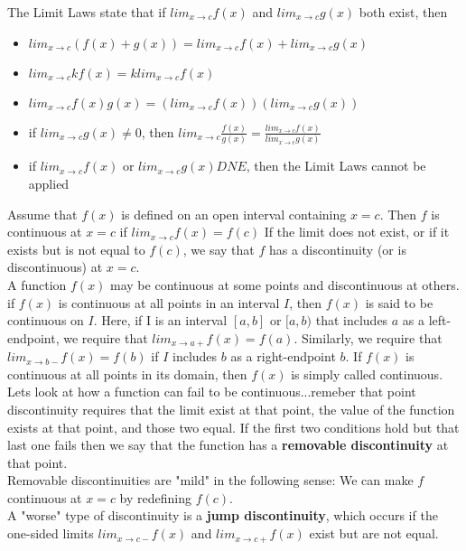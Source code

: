 \documentclass{article}
\begin{document}
	The Limit Laws state that if $lim_{x \to c}f(x)$ and $lim_{x \to c}g(x)$ both exist, then
		\begin{itemize}
			\item $lim_{x \to c}(f(x) + g(x)) = lim_{x \to c}f(x) + lim_{x \to c}g(x)$
			\item $lim_{x \to c}kf(x) = klim_{x \to c}f(x)$
			\item $lim_{x \to c}f(x)g(x) = (lim_{x \to c}f(x))(lim_{x \to c}g(x))$
			\item if $lim_{x \to c}g(x) \neq 0$, then $lim_{x \to c}\frac{f(x)}{g(x)} = \frac{lim_{x \to c}f(x)}{lim_{x \to c}g(x)}$
			\item if $lim_{x \to c}f(x)$ or $lim_{x \to c}g(x) DNE$, then the Limit Laws cannot be applied
		\end{itemize}

	Assume that $f(x)$ is defined on an open interval containing $x = c$. Then $f$ is continuous at $x = c$ if $lim_{x \to c}f(x) = f(c)$ If the limit does not exist, or if it exists but is not equal to $f(c)$, we say that $f$ has a discontinuity (or is discontinuous) at $x = c$.\\

	A function $f(x)$ may be continuous at some points and discontinuous at others. if $f(x)$ is continuous at all points in an interval $I$, then $f(x)$ is said to be continuous on $I$. Here, if I is an interval $[a, b]$ or $[a, b)$ that includes $a$ as a left-endpoint, we require that $lim_{x \to a+}f(x) = f(a)$. Similarly, we require that $lim_{x \to b-}f(x) = f(b)$ if $I$ includes $b$ as a right-endpoint $b$. If $f(x)$ is continuous at all points in its domain, then $f(x)$ is simply called continuous.\\

	Lets look at how a function can fail to be continuous...remeber that point discontinuity requires that the limit exist at that point, the value of the function exists at that point, and those two equal. If the first two conditions hold but that last one fails then we say that the function has a \textbf{removable discontinuity} at that point.\\

	Removable discontinuities are "mild" in the following sense: We can make $f$ continuous at $x = c$ by redefining $f(c)$.\\

	A "worse" type of discontinuity is a \textbf{jump discontinuity}, which occurs if the one-sided limits $lim_{x \to c-}f(x)$ and $lim_{x \to c+}f(x)$ exist but are not equal.\\
\end{document}
